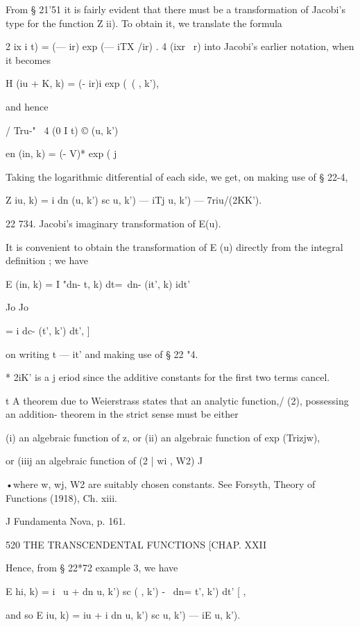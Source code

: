 From § 21'51 it is fairly evident that there must be a transformation
of Jacobi's type for the function Z ii). To obtain it, we translate
the formula

 2 ix i t) = (— ir) exp (— iTX /ir) . 4 (ixr \ r) into Jacobi's
earlier notation, when it becomes



H (iu + K, k) = (- ir)i exp (\ ( , k'),



and hence



/ Tru-" \ 4 (0 I t) © (u, k')



en (in, k) = (- V)* exp ( j



Taking the logarithmic ditferential of each side, we get, on making
use of § 22-4,

Z iu, k) = i dn (u, k') sc u, k') — iTj u, k') — 7riu/(2KK').

22 734. Jacobi's imaginary transformation of E(u).

It is convenient to obtain the transformation of E (u) directly from
the integral definition ; we have

E (in, k) = I "dn- t, k) dt=\ dn- (it', k) idt'

Jo Jo

= i dc- (t', k') dt', ]

on writing t — it' and making use of § 22 "4.

* 2iK' is a j eriod since the additive constants for the first two
terms cancel.

t A theorem due to Weierstrass states that an analytic function,/ (2),
possessing an addition- theorem in the strict sense must be either

(i) an algebraic function of z, or (ii) an algebraic function of exp
(Trizjw),

or (iiij an algebraic function of (2 | wi , W2) J

•where w, wj, W2 are suitably chosen constants. See Forsyth, Theory of
Functions (1918), Ch. xiii.

J Fundamenta Nova, p. 161.



520 THE TRANSCENDENTAL FUNCTIONS [CHAP. XXII

Hence, from § 22*72 example 3, we have

E hi, k) = i \ u + dn u, k') sc ( , k') - \ dn= t', k') dt' [ ,

and so E iu, k) = iu + i dn u, k') sc u, k') — iE u, k').

